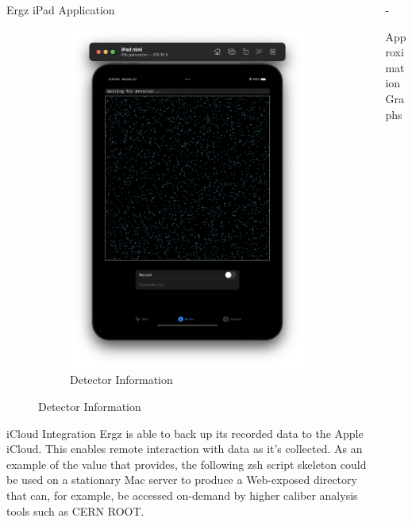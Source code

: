 \documentclass{beamer}
\begin{document}
\begin{frame}
\begin{columns}[t]
\begin{column}{0.38\linewidth}
\begin{block}{Ergz iPad Application}
\begin{figure}
\begin{subfigure}{.5\textwidth}
            \includegraphics[width=.9\linewidth]{screen2.png}
            \caption{Detector Information}
          \end{subfigure}
        \end{figure}
      \end{block}
      \begin{block}{iCloud Integration}
        Ergz is able to back up its recorded data to the Apple iCloud. This enables remote interaction with data as it's collected. As an example of the value that provides, the following zsh script skeleton could be used on a stationary Mac server to produce a Web-exposed directory that can, for example, be accessed on-demand by higher caliber analysis tools such as CERN ROOT.
        

      \end{block}
    \end{column}
    \begin{column}{0.24\linewidth}
      -\begin{block}{Approximation Graphs}


\end{block}
\end{column}
\end{columns}
\end{frame}
\end{document}
